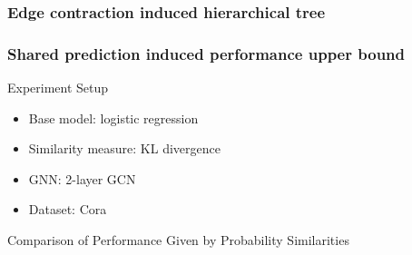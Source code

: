 \documentclass[10pt]{beamer}
\begin{document}
\begin{frame}
	\frametitle{Edge contraction induced hierarchical tree}
	\centerline{\scalebox{0.75}{}}
	\centerline{\scalebox{0.75}{}}
\end{frame}

\begin{frame}
	\frametitle{Shared prediction induced performance upper bound}
    \centering{\scalebox{1.2}{}}
\end{frame}

\begin{frame}{Experiment Setup}
    \begin{itemize}
        \item Base model: logistic regression
        \item Similarity measure: KL divergence
        \item GNN: 2-layer GCN
        \item Dataset: Cora
    \end{itemize}
\end{frame}

\begin{frame}{Comparison of Performance Given by Probability Similarities}
    
\end{frame}
\end{document}
